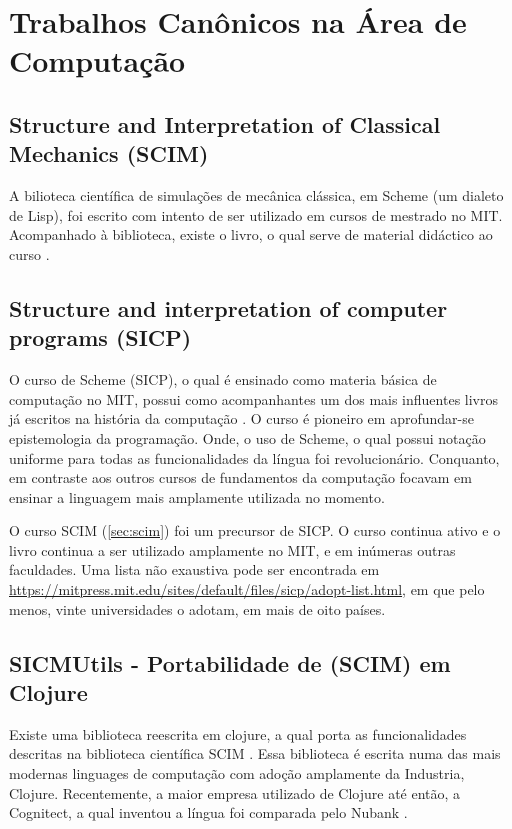 \documentclass[
12pt,				%
openright,			%
oneside,			%
a4paper,			%
english,			%
french,				%
spanish,			%
brazil,				%
]{abntex2}
\begin{document}


\section{Trabalhos Canônicos na Área de Computação}
\subsection{Structure and Interpretation of Classical Mechanics (SCIM)}
\label{sec:scim}
A bilioteca científica de simulações de mecânica clássica, em Scheme (um dialeto de Lisp), foi escrito com intento de ser utilizado em cursos de mestrado no MIT. Acompanhado à biblioteca, existe o livro, o qual serve de material didáctico ao curso \cite{sussman2015structure}.

\subsection{Structure and interpretation of computer programs (SICP)}
O curso de Scheme (SICP), o qual é ensinado como materia básica de computação no MIT, possui como acompanhantes um dos mais influentes livros já escritos na história da computação \cite{abelson1996structure}. O curso é pioneiro em aprofundar-se epistemologia da programação. Onde, o uso de Scheme, o qual possui notação uniforme para todas as funcionalidades da língua foi revolucionário. Conquanto, em contraste aos outros cursos de fundamentos da computação focavam em ensinar a linguagem mais amplamente utilizada no momento.

O curso SCIM (\autoref{sec:scim}) foi um precursor de SICP. O curso continua ativo e o livro continua a ser utilizado amplamente no MIT, e em inúmeras outras faculdades. Uma lista não exaustiva pode ser encontrada em \url{https://mitpress.mit.edu/sites/default/files/sicp/adopt-list.html}, em que pelo menos, vinte universidades o adotam, em mais de oito países.

\subsection{SICMUtils - Portabilidade de (SCIM) em Clojure}
Existe uma biblioteca reescrita em clojure, a qual porta as funcionalidades descritas na biblioteca científica SCIM \cite{sicmutils2016github}. Essa biblioteca é escrita numa das mais modernas linguages de computação com adoção amplamente da Industria, Clojure. Recentemente, a maior empresa utilizado de Clojure até então, a Cognitect, a qual inventou a língua foi comparada pelo Nubank \cite{clojure2020}.
\end{document}
